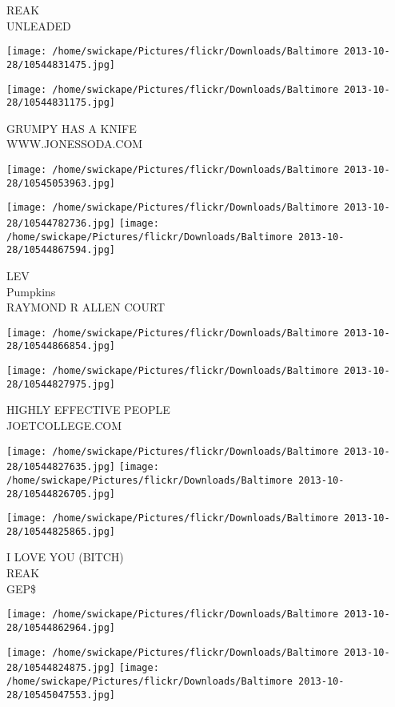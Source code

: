 \documentclass[10pt,letterpaper]{article}
\begin{document}
REAK\\
UNLEADED
\pagebreak

\texttt{[image: /home/swickape/Pictures/flickr/Downloads/Baltimore 2013-10-28/10544831475.jpg]}

\vspace{0.25in}
\texttt{[image: /home/swickape/Pictures/flickr/Downloads/Baltimore 2013-10-28/10544831175.jpg]}

GRUMPY HAS A KNIFE\\
WWW.JONESSODA.COM
\pagebreak

\texttt{[image: /home/swickape/Pictures/flickr/Downloads/Baltimore 2013-10-28/10545053963.jpg]}

\vspace{0.25in}
\texttt{[image: /home/swickape/Pictures/flickr/Downloads/Baltimore 2013-10-28/10544782736.jpg]}
\texttt{[image: /home/swickape/Pictures/flickr/Downloads/Baltimore 2013-10-28/10544867594.jpg]}

LEV\\
Pumpkins\\
RAYMOND R ALLEN COURT
\pagebreak

\texttt{[image: /home/swickape/Pictures/flickr/Downloads/Baltimore 2013-10-28/10544866854.jpg]}

\vspace{0.25in}
\texttt{[image: /home/swickape/Pictures/flickr/Downloads/Baltimore 2013-10-28/10544827975.jpg]}

HIGHLY EFFECTIVE PEOPLE\\
JOETCOLLEGE.COM
\pagebreak

\texttt{[image: /home/swickape/Pictures/flickr/Downloads/Baltimore 2013-10-28/10544827635.jpg]}
\texttt{[image: /home/swickape/Pictures/flickr/Downloads/Baltimore 2013-10-28/10544826705.jpg]}

\texttt{[image: /home/swickape/Pictures/flickr/Downloads/Baltimore 2013-10-28/10544825865.jpg]}

I LOVE YOU (BITCH)\\
REAK\\
GEP\$
\pagebreak

\texttt{[image: /home/swickape/Pictures/flickr/Downloads/Baltimore 2013-10-28/10544862964.jpg]}

\vspace{0.25in}
\texttt{[image: /home/swickape/Pictures/flickr/Downloads/Baltimore 2013-10-28/10544824875.jpg]}
\texttt{[image: /home/swickape/Pictures/flickr/Downloads/Baltimore 2013-10-28/10545047553.jpg]}
\end{document}
